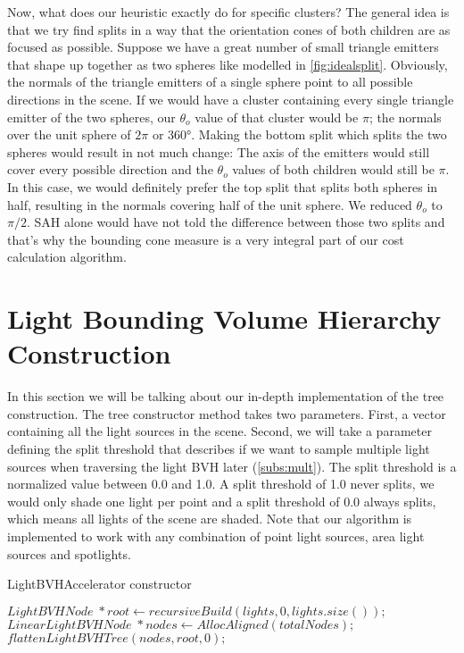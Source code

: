 Now, what does our heuristic exactly do for specific clusters? The general idea is that we try find splits in a way that the orientation cones of both children are as focused as possible. Suppose we have a great number of small triangle emitters that shape up together as two spheres like modelled in \ref{fig:idealsplit}. Obviously, the normals of the triangle emitters of a single sphere point to all possible directions in the scene. If we would have a cluster containing every single triangle emitter of the two spheres, our $\theta_o$ value of that cluster would be $\pi$; the normals over the unit sphere of $2\pi$ or 360°. Making the bottom split which splits the two spheres would result in not much change: The axis of the emitters would still cover every possible direction and the $\theta_o$ values of both children would still be $\pi$. In this case, we would definitely prefer the top split that splits both spheres in half, resulting in the normals covering half of the unit sphere. We reduced $\theta_o$ to $\pi/2$. SAH alone would have not told the difference between those two splits and that's why the bounding cone measure is a very integral part of our cost calculation algorithm.

\section{Light Bounding Volume Hierarchy Construction}
\label{sec:alg:con}

In this section we will be talking about our in-depth implementation of the tree construction. The tree constructor method takes two parameters. First, a vector containing all the light sources in the scene. Second, we will take a parameter defining the split threshold that describes if we want to sample multiple light sources when traversing the light BVH later (\ref{subs:mult}). The split threshold is a normalized value between 0.0 and 1.0. A split threshold of 1.0 never splits, we would only shade one light per point and a split threshold of 0.0 always splits, which means all lights of the scene are shaded. Note that our algorithm is implemented to work with any combination of point light sources, area light sources and spotlights.

\begin{algorithm}
	\caption{LightBVHAccelerator constructor}
	\label{LightBVHAccelerator}
	\begin{algorithmic}[1] %
		\State $LightBVHNode \; *root  \gets recursiveBuild(lights, 0, lights.size());$
		\State $LinearLightBVHNode \; *nodes \gets AllocAligned(totalNodes);$ 
		\State $flattenLightBVHTree(nodes, root, 0);$
		\EndProcedure
	\end{algorithmic}
\end{algorithm}

